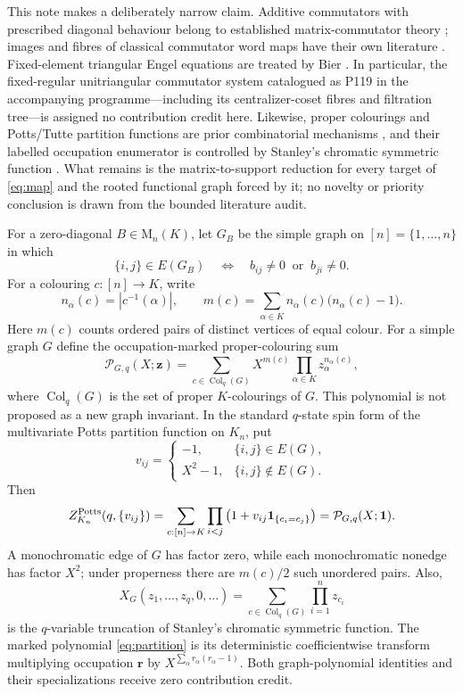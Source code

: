 \documentclass[a4paper,10pt]{amsart}
\theoremstyle{remark}
\newcommand{\Mat}{\mathrm M}
\newcommand{\Col}{\operatorname{Col}}
\begin{document}
This note makes a deliberately narrow claim.  Additive commutators with
prescribed diagonal behaviour belong to established matrix-commutator
theory \cite{Young2021,KadyrsizovaYerlanov2022}; images and fibres of
classical commutator word maps have their own literature
\cite{Baddeley1994,LarsenLu2021}.  Fixed-element triangular Engel equations
are treated by Bier \cite{Bier2013}.  In particular, the fixed-regular
unitriangular commutator system catalogued as P119 in the accompanying
programme---including its centralizer-coset fibres and filtration tree---is
assigned no contribution credit here.  Likewise, proper colourings and
Potts/Tutte partition functions are prior combinatorial mechanisms
\cite{Sokal2005}, and their labelled occupation enumerator is controlled by
Stanley's chromatic symmetric function \cite{Stanley1995}.  What remains is
the matrix-to-support reduction for every target of \eqref{eq:map} and the
rooted functional graph forced by it; no novelty or priority conclusion is
drawn from the bounded literature audit.

For a zero-diagonal $B\in\Mat_n(K)$, let $G_B$ be the simple graph on
$[n]=\{1,\ldots,n\}$ in which
\begin{equation}\label{eq:support}
 \{i,j\}\in E(G_B)
 \quad\Longleftrightarrow\quad
 b_{ij}\ne0\ \text{ or }\ b_{ji}\ne0.
\end{equation}
For a colouring $c:[n]\to K$, write
\[
 n_\alpha(c)=|c^{-1}(\alpha)|,
 \qquad
 m(c)=\sum_{\alpha\in K}n_\alpha(c)\bigl(n_\alpha(c)-1\bigr).
\]
Here $m(c)$ counts ordered pairs of distinct vertices of equal colour.  For
a simple graph $G$ define the occupation-marked proper-colouring sum
\begin{equation}\label{eq:partition}
 \mathcal P_{G,q}(X;\boldsymbol z)
 =\sum_{c\in\Col_q(G)}
 X^{m(c)}\prod_{\alpha\in K}z_\alpha^{n_\alpha(c)},
\end{equation}
where $\Col_q(G)$ is the set of proper $K$-colourings of $G$.
This polynomial is not proposed as a new graph invariant.  In the standard
$q$-state spin form of the multivariate Potts partition function on $K_n$,
put
\[
 v_{ij}=\begin{cases}
 -1,&\{i,j\}\in E(G),\\
 X^2-1,&\{i,j\}\notin E(G).
 \end{cases}
\]
Then
\begin{equation}\label{eq:potts-owner}
 Z^{\rm Potts}_{K_n}\!\left(q,\{v_{ij}\}\right)
 =\sum_{c:[n]\to K}\prod_{i<j}
   \left(1+v_{ij}\mathbf1_{\{c_i=c_j\}}\right)
 =\mathcal P_{G,q}(X;\boldsymbol1).
\end{equation}
A monochromatic edge of $G$ has factor zero, while each monochromatic
nonedge has factor $X^2$; under properness there are $m(c)/2$ such unordered
pairs.  Also,
\[
 X_G(z_1,\ldots,z_q,0,\ldots)
 =\sum_{c\in\Col_q(G)}\prod_{i=1}^n z_{c_i}
\]
is the $q$-variable truncation of Stanley's chromatic symmetric function.
The marked polynomial \eqref{eq:partition} is its deterministic
coefficientwise transform multiplying occupation $\boldsymbol r$ by
$X^{\sum_\alpha r_\alpha(r_\alpha-1)}$.  Both graph-polynomial identities
and their specializations receive zero contribution credit.
\end{document}
